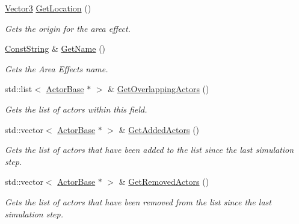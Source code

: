 \begin{DoxyCompactItemize}
\hyperlink{classphys_1_1Vector3}{Vector3} \hyperlink{classphys_1_1AreaEffect_a76040dd90ff314ea6973dccf4e90ba37}{GetLocation} ()
\begin{DoxyCompactList}\small\item\em Gets the origin for the area effect. \item\end{DoxyCompactList}\item 
\hyperlink{namespacephys_a5ce5049f8b4bf88d6413c47b504ebb31}{ConstString} \& \hyperlink{classphys_1_1AreaEffect_a6395eeec0a3aec2385027cca35cf15cb}{GetName} ()
\begin{DoxyCompactList}\small\item\em Gets the Area Effects name. \item\end{DoxyCompactList}\item 
std::list$<$ \hyperlink{classphys_1_1ActorBase}{ActorBase} $\ast$ $>$ \& \hyperlink{classphys_1_1AreaEffect_ab995fec11d9e5fbae1851109067958db}{GetOverlappingActors} ()
\begin{DoxyCompactList}\small\item\em Gets the list of actors within this field. \item\end{DoxyCompactList}\item 
std::vector$<$ \hyperlink{classphys_1_1ActorBase}{ActorBase} $\ast$ $>$ \& \hyperlink{classphys_1_1AreaEffect_a72a9673c926ce876df630c4aecfc09f6}{GetAddedActors} ()
\begin{DoxyCompactList}\small\item\em Gets the list of actors that have been added to the list since the last simulation step. \item\end{DoxyCompactList}\item 
std::vector$<$ \hyperlink{classphys_1_1ActorBase}{ActorBase} $\ast$ $>$ \& \hyperlink{classphys_1_1AreaEffect_a021763db69e977a3a19ad7cc39df073b}{GetRemovedActors} ()
\begin{DoxyCompactList}\small\item\em Gets the list of actors that have been removed from the list since the last simulation step. \item\end{DoxyCompactList}\end{DoxyCompactItemize}
